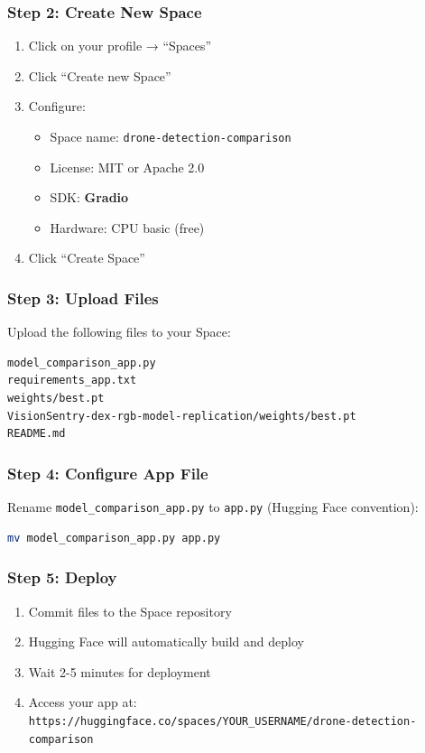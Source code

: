 \documentclass[11pt,a4paper]{article}
\begin{document}
\subsubsection{Step 2: Create New Space}
\begin{enumerate}
    \item Click on your profile → ``Spaces''
    \item Click ``Create new Space''
    \item Configure:
    \begin{itemize}
        \item Space name: \texttt{drone-detection-comparison}
        \item License: MIT or Apache 2.0
        \item SDK: \textbf{Gradio}
        \item Hardware: CPU basic (free)
    \end{itemize}
    \item Click ``Create Space''
\end{enumerate}

\subsubsection{Step 3: Upload Files}
Upload the following files to your Space:
\begin{lstlisting}[language=bash]
model_comparison_app.py
requirements_app.txt
weights/best.pt
VisionSentry-dex-rgb-model-replication/weights/best.pt
README.md
\end{lstlisting}

\subsubsection{Step 4: Configure App File}
Rename \texttt{model\_comparison\_app.py} to \texttt{app.py} (Hugging Face convention):
\begin{lstlisting}[language=bash]
mv model_comparison_app.py app.py
\end{lstlisting}

\subsubsection{Step 5: Deploy}
\begin{enumerate}
    \item Commit files to the Space repository
    \item Hugging Face will automatically build and deploy
    \item Wait 2-5 minutes for deployment
    \item Access your app at: \texttt{https://huggingface.co/spaces/YOUR\_USERNAME/drone-detection-comparison}
\end{enumerate}
\end{document}
